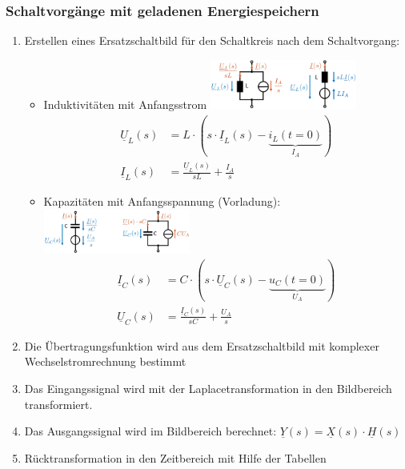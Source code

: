 \subsubsection{Schaltvorgänge mit geladenen Energiespeichern}
\begin{enumerate}
    \item Erstellen eines Ersatzschaltbild für den Schaltkreis nach dem
        Schaltvorgang:
        \begin{itemize}
            \item Induktivitäten mit Anfangsstrom
                \includegraphics[width=0.40\textwidth]{Bilder/ESB_Fuer_stromfuehrende_Induktivitaet}
                \begin{align*}
                    \underline{U}_L(s) &= L\cdot(s\cdot\underline{I}_L(s)-\underbrace{i_L(t=0)}_{I_A})\\
                    \underline{I}_L(s) &= \frac{\underline{U}_L(s)}{sL}+\frac{I_A}{s}
                \end{align*}
            \item Kapazitäten mit Anfangsspannung (Vorladung):
                \includegraphics[width=0.40\textwidth]{Bilder/ESB_Fuer_geladene_Kapazitaet}
                \begin{align*}
                    \underline{I}_C(s) &= C\cdot(s\cdot\underline{U}_C(s)-\underbrace{u_C(t=0)}_{U_A})\\
                    \underline{U}_C(s) &= \frac{\underline{I}_C(s)}{sC}+\frac{U_A}{s}
                \end{align*}
        \end{itemize}
    \item Die Übertragungsfunktion wird aus dem Ersatzschaltbild mit komplexer
        Wechselstromrechnung bestimmt
    \item Das Eingangssignal wird mit der Laplacetransformation in den Bildbereich
        transformiert.
    \item Das Ausgangssignal wird im Bildbereich berechnet: $\underline{Y}(s) =
        \underline{X}(s)\cdot \underline{H}(s)$
    \item Rücktransformation in den Zeitbereich mit Hilfe der Tabellen
\end{enumerate}
